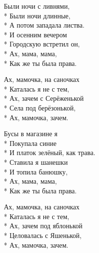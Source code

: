 \medskip

\begin{minipage}{\linewidth}
Были ночи с ливнями,\\*
Были ночи длинные,\\*
А потом западала листва.\\*
И осенним вечером\\*
Городскую встретил он, \\*
Ах, мама, мама,\\*
Как же ты была права.\\
\end{minipage}\par\medskip\nobreak

\medskip

\begin{minipage}{\linewidth}
\hspace*{1.5em}Ах, мамочка, на саночках\\*
\hspace*{1.5em}Каталась я не с тем,\\*
\hspace*{1.5em}Ах, зачем с Серёженькой\\*
\hspace*{1.5em}Села под берёзонькой,\\*
\hspace*{1.5em}Ах, мамочка, зачем.\\
\end{minipage}\par\medskip\nobreak

\medskip

\begin{minipage}{\linewidth}
Бусы в магазине я\\*
Покупала синие\\*
И платок зелёный, как трава.\\*
Ставила я шанешки\\*
И топила банюшку,\\*
Ах, мама, мама,\\*
Как же ты была права.\\
\end{minipage}\par\medskip\nobreak

\medskip

\begin{minipage}{\linewidth}
\hspace*{1.5em}Ах, мамочка, на саночках\\*
\hspace*{1.5em}Каталась я не с тем,\\*
\hspace*{1.5em}Ах, зачем под яблонькой\\*
\hspace*{1.5em}Целовалась с Яшенькой,\\*
\hspace*{1.5em}Ах, мамочка, зачем.\\
\end{minipage}\par\medskip\nobreak

